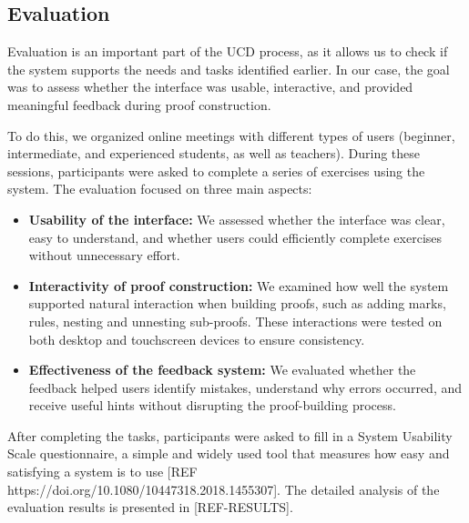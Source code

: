 \subsection{Evaluation}
Evaluation is an important part of the \gls{UCD} process, as it allows us to check if the system supports the needs and tasks identified earlier. In our case, the goal was to assess whether the interface was usable, interactive, and provided meaningful feedback during proof construction.

To do this, we organized online meetings with different types of users (beginner, intermediate, and experienced students, as well as teachers). During these sessions, participants were asked to complete a series of exercises using the system. The evaluation focused on three main aspects:

\begin{itemize}
    \item \textbf{Usability of the interface:} We assessed whether the interface was clear, easy to understand, and whether users could efficiently complete exercises without unnecessary effort.
    \item \textbf{Interactivity of proof construction:} We examined how well the system supported natural interaction when building proofs, such as adding marks, rules, nesting and unnesting sub-proofs. These interactions were tested on both desktop and touchscreen devices to ensure consistency.
    \item \textbf{Effectiveness of the feedback system:} We evaluated whether the feedback helped users identify mistakes, understand why errors occurred, and receive useful hints without disrupting the proof-building process.
\end{itemize}

After completing the tasks, participants were asked to fill in a System Usability Scale questionnaire, a simple and widely used tool that measures how easy and satisfying a system is to use [REF https://doi.org/10.1080/10447318.2018.1455307]. The detailed analysis of the evaluation results is presented in [REF-RESULTS].

